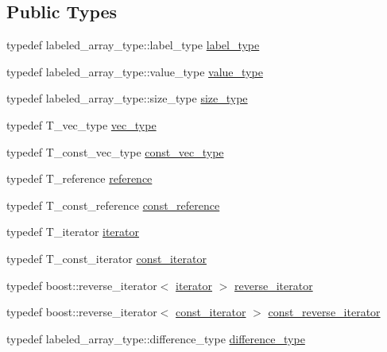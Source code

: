 \subsection*{Public Types}
\begin{DoxyCompactItemize}
\item 
typedef labeled\+\_\+array\+\_\+type\+::label\+\_\+type \hyperlink{classIceBRG_1_1labeled__array__vecs_a2bbe62200750107fc665bd86753bff4f}{label\+\_\+type}
\item 
typedef labeled\+\_\+array\+\_\+type\+::value\+\_\+type \hyperlink{classIceBRG_1_1labeled__array__vecs_ac065b9242f4296223c4415479ca5f5c6}{value\+\_\+type}
\item 
typedef labeled\+\_\+array\+\_\+type\+::size\+\_\+type \hyperlink{classIceBRG_1_1labeled__array__vecs_a9395382460f12145dc0c835e78283fdd}{size\+\_\+type}
\item 
typedef T\+\_\+vec\+\_\+type \hyperlink{classIceBRG_1_1labeled__array__vecs_aa0fdd516085cd0ab638b05ff66cae352}{vec\+\_\+type}
\item 
typedef T\+\_\+const\+\_\+vec\+\_\+type \hyperlink{classIceBRG_1_1labeled__array__vecs_a02abd04f15383823d790ea596eee00ed}{const\+\_\+vec\+\_\+type}
\item 
typedef T\+\_\+reference \hyperlink{classIceBRG_1_1labeled__array__vecs_a83e2aad33d65d344a7df84aab091e48d}{reference}
\item 
typedef T\+\_\+const\+\_\+reference \hyperlink{classIceBRG_1_1labeled__array__vecs_a5ab1d23d61a03d4f64756b59f5773d41}{const\+\_\+reference}
\item 
typedef T\+\_\+iterator \hyperlink{classIceBRG_1_1labeled__array__vecs_a989cbe0a7bc0b96a206c52ddd3513a23}{iterator}
\item 
typedef T\+\_\+const\+\_\+iterator \hyperlink{classIceBRG_1_1labeled__array__vecs_a6003abed56d6f931ce74524cda329972}{const\+\_\+iterator}
\item 
typedef boost\+::reverse\+\_\+iterator$<$ \hyperlink{classIceBRG_1_1labeled__array__vecs_a989cbe0a7bc0b96a206c52ddd3513a23}{iterator} $>$ \hyperlink{classIceBRG_1_1labeled__array__vecs_ab3d90428e6ba03e8a3bcb3b44629e3f5}{reverse\+\_\+iterator}
\item 
typedef boost\+::reverse\+\_\+iterator$<$ \hyperlink{classIceBRG_1_1labeled__array__vecs_a6003abed56d6f931ce74524cda329972}{const\+\_\+iterator} $>$ \hyperlink{classIceBRG_1_1labeled__array__vecs_aefecf82bcd5d24b2c6fc29b4f8930054}{const\+\_\+reverse\+\_\+iterator}
\item 
typedef labeled\+\_\+array\+\_\+type\+::difference\+\_\+type \hyperlink{classIceBRG_1_1labeled__array__vecs_ab3914361470feba7994ebc0f84ea683b}{difference\+\_\+type}
\end{DoxyCompactItemize}
